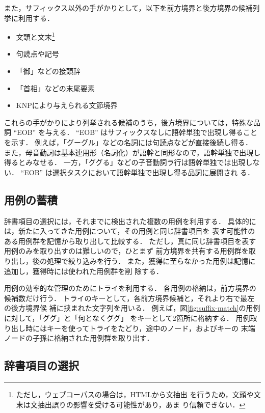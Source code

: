 \documentclass[japanese]{jnlp_1.4}
\begin{document}
また，サフィックス以外の手がかりとして，以下を前方境界と後方境界の候補列
挙に利用する．
\begin{itemize}
\item 文頭と文末\footnote{ただし，ウェブコーパスの場合は，HTMLから文抽出
      を行うため，文頭や文末は文抽出誤りの影響を受ける可能性があり，あま
      り信頼できない．}
\item 句読点や記号
\item 「御」などの接頭辞
\item 「首相」などの末尾要素
\item KNPにより与えられる文節境界
\end{itemize}
これらの手がかりにより列挙される候補のうち，後方境界については，特殊な品
詞 ``EOB'' を与える．
``EOB'' はサフィックスなしに語幹単独で出現し得ることを示す．
例えば，「グーグル」などの名詞には句読点などが直接後続し得る．
また，母音動詞は基本連用形（名詞化）が語幹と同形なので，語幹単独で出現し
得るとみなせる．
一方，「ググる」などの子音動詞ラ行は語幹単独では出現しない．
``EOB'' は選択タスクにおいて語幹単独で出現し得る品詞に展開され
る．




\subsection{用例の蓄積} \label{sec:selection-accumulation}

辞書項目の選択には，それまでに検出された複数の用例を利用する．
具体的には，新たに入ってきた用例について，その用例と同じ辞書項目を
表す可能性のある用例群を記憶から取り出して比較する．
ただし，真に同じ辞書項目を表す用例のみを取り出すのは難しいので，ひとまず
前方境界を共有する用例群を取り出し，後の処理で絞り込みを行う．
また，獲得に至らなかった用例は記憶に追加し，獲得時には使われた用例群を削
除する．

用例の効率的な管理のためにトライを利用する．
各用例の格納は，前方境界の候補数だけ行う．
トライのキーとして，各前方境界候補と，それより右で最左の後方境界候
補に挟まれた文字列を用いる．
例えば，図\ref{fig:suffix-match}の用例に対して，「ググ」と「何となくググ」
をキーとして2箇所に格納する．
用例取り出し時にはキーを使ってトライをたどり，途中のノード，およびキーの
末端ノードの子孫に格納された用例群を取り出す．



\subsection{辞書項目の選択} \label{sec:selection-method}
\end{document}
